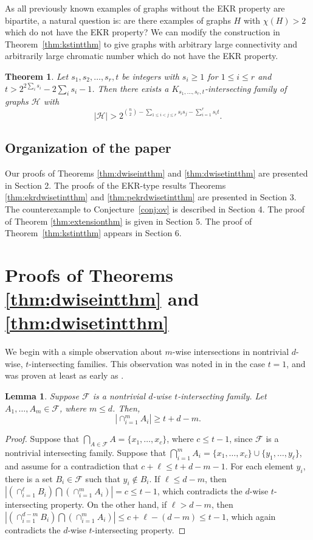 \documentclass[12pt]{article}
\newtheorem{theorem}{Theorem}
\newtheorem{lemma}{Lemma}
\theoremstyle{definition}
\newcommand{\cH}{\mathcal{H}}
\newcommand{\cF}{\mathcal{F}}
\begin{document}
As all previously known examples of graphs without the EKR property are bipartite, a natural question is: are there examples of graphs $H$ with $\chi(H) > 2$ which do not have the EKR property? We can modify the construction in Theorem~\ref{thm:kstintthm} to give graphs with arbitrary large connectivity and arbitrarily large chromatic number which do not have the EKR property. 

\begin{theorem}\label{ks1srtint}
Let $s_1, s_2, \ldots, s_r, t$ be integers with $s_i \ge 1$ for $1\le i\le r$ and $t > 2^{2\sum_{i} s_i} -2\sum_{i}s_i - 1$. Then there exists a $K_{s_1, \ldots, s_r, t}$-intersecting family of graphs $\cH$ with \[|\cH| > 2^{\binom{n}{2} - \sum_{1\le i < j \le r}s_is_j - \sum_{i=1}^rs_i t}.\]
\end{theorem}

\subsection{Organization of the paper} 
Our proofs of Theorems \ref{thm:dwiseintthm} and \ref{thm:dwisetintthm} are presented in Section 2. The proofs of the EKR-type results Theorems \ref{thm:ekrdwisetintthm} and \ref{thm:pekrdwisetintthm} are presented in Section 3. The counterexample to Conjecture~\ref{conj:ov} is described in Section 4. The proof of Theorem \ref{thm:extensionthm} is given in Section 5. The proof of Theorem~\ref{thm:kstintthm} appears in Section 6. 

\section{Proofs of Theorems \ref{thm:dwiseintthm} and \ref{thm:dwisetintthm}}

We begin with a simple observation about $m$-wise intersections in nontrivial $d$-wise, $t$-intersecting families. This observation was noted in \cite{OV} in the case $t=1$, and was proven at least as early as \cite{FT3}.

\begin{lemma}\label{lem:msetslem}
Suppose $\cF$ is a nontrivial $d$-wise $t$-intersecting family. Let $A_1, \ldots, A_m \in \cF$, where $m\le d$. Then, 
\[|\cap_{i=1}^m A_i| \ge t + d - m.\]
\end{lemma}
\begin{proof}
Suppose that $\bigcap_{A\in\cF}A = \{x_1, \ldots, x_c\}$, where $c\le t-1$, since $\cF$ is a nontrivial intersecting family. Suppose that $\bigcap_{i=1}^mA_i = \{x_1, \ldots, x_c\} \cup \{y_1, \ldots, y_{\ell}\}$, and assume for a contradiction that $c + \ell \le t+d-m-1$. For each element $y_i$, there is a set $B_i \in \cF$ such that $y_i \notin B_i$.  If $\ell \le d - m$, then $|(\cap_{i=1}^{\ell}B_i) \bigcap (\cap_{i=1}^m A_i )|  = c \le t-1$, which contradicts the $d$-wise $t$-intersecting property. On the other hand, if $\ell > d - m$, then $|(\cap_{i=1}^{d-m}B_i) \bigcap (\cap_{i=1}^m A_i )|  \le c + \ell - (d-m)  \le t-1$, which again contradicts the $d$-wise $t$-intersecting property. 
\end{proof}
\end{document}
